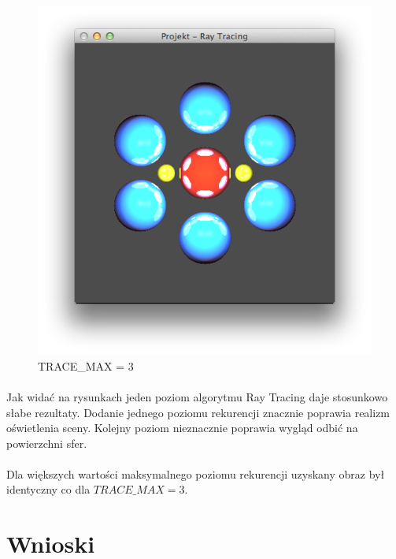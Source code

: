 \documentclass[wide,a4paper,titlepage,12pt] {article}
\begin{document}
  \begin{figure}[h!]
    \begin{center}
      \includegraphics[width=\textwidth]{3.png}
      \caption{TRACE\_MAX = 3}
    \end{center}
  \end{figure}


  \newpage
  \paragraph{}
  Jak widać na rysunkach jeden poziom algorytmu Ray Tracing daje stosunkowo słabe rezultaty. Dodanie jednego poziomu rekurencji znacznie poprawia realizm oświetlenia sceny. Kolejny poziom nieznacznie poprawia wygląd odbić na powierzchni sfer.
  \paragraph{}
  Dla większych wartości maksymalnego poziomu rekurencji uzyskany obraz był identyczny co dla $TRACE\_MAX = 3$.

  \newpage
  \paragraph{}
  \newpage
  \section{Wnioski}
\end{document}
